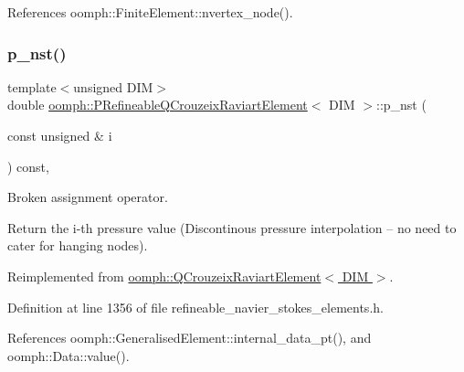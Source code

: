 References oomph\+::\+Finite\+Element\+::nvertex\+\_\+node().

\mbox{\label{classoomph_1_1PRefineableQCrouzeixRaviartElement_a2a9613cf21e1d115893491423ca5394a}} 
\subsubsection{\texorpdfstring{p\+\_\+nst()}{p\_nst()}\hspace{0.1cm}{\footnotesize\ttfamily [1/2]}}
{\footnotesize\ttfamily template$<$unsigned D\+IM$>$ \\
double \hyperlink{classoomph_1_1PRefineableQCrouzeixRaviartElement}{oomph\+::\+P\+Refineable\+Q\+Crouzeix\+Raviart\+Element}$<$ D\+IM $>$\+::p\+\_\+nst (\begin{DoxyParamCaption}\item[{const unsigned \&}]{i }\end{DoxyParamCaption}) const\hspace{0.3cm}{\ttfamily [inline]}, {\ttfamily [virtual]}}



Broken assignment operator. 

Return the i-\/th pressure value (Discontinous pressure interpolation -- no need to cater for hanging nodes). 

Reimplemented from \hyperlink{classoomph_1_1QCrouzeixRaviartElement_a3d3b2f685b66899fa0d56745bf5043d9}{oomph\+::\+Q\+Crouzeix\+Raviart\+Element$<$ D\+I\+M $>$}.



Definition at line 1356 of file refineable\+\_\+navier\+\_\+stokes\+\_\+elements.\+h.



References oomph\+::\+Generalised\+Element\+::internal\+\_\+data\+\_\+pt(), and oomph\+::\+Data\+::value().

\mbox{\label{classoomph_1_1PRefineableQCrouzeixRaviartElement_a1a70b2251c5150e4719db4e26bbde7f0}} 
